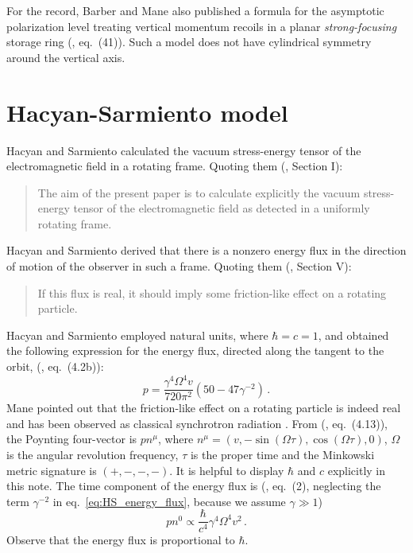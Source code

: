 \documentclass[review]{elsarticle}
\theoremstyle{plain}
\begin{document}
For the record,
Barber and Mane also published a formula for the asymptotic polarization level treating vertical momentum recoils in a planar \emph{strong-focusing} storage ring (\cite{BM}, eq.~(41)).
Such a model does not have cylindrical symmetry around the vertical axis.

\setcounter{equation}{0}
\section{Hacyan-Sarmiento model}\label{sec:HS}
Hacyan and Sarmiento \cite{HS} calculated the vacuum stress-energy tensor of the electromagnetic field in a rotating frame.
Quoting them (\cite{HS}, Section I):
\begin{quote}
The aim of the present paper is to calculate explicitly
the vacuum stress-energy tensor of the electromagnetic
field as detected in a uniformly rotating frame.
\end{quote}
Hacyan and Sarmiento derived that there is a nonzero energy flux in the direction of motion of the observer in such a frame.
Quoting them (\cite{HS}, Section V):
\begin{quote}
If this flux is real, it should imply some friction-like effect on a rotating particle.
\end{quote}
Hacyan and Sarmiento employed natural units, where $\hbar=c=1$, and obtained the following expression for the energy flux, directed along the tangent to the orbit,
(\cite{HS}, eq.~(4.2b)):
\begin{equation}
\label{eq:HS_energy_flux}
p = \frac{\gamma^4\Omega^4v}{720\pi^2}(50 -47\gamma^{-2}) \,.
\end{equation}
Mane \cite{ManeHS} pointed out that the friction-like effect on a rotating particle is indeed real and has been observed as classical synchrotron radiation \cite{Schwinger1949}.
From (\cite{HS}, eq.~(4.13)), the Poynting four-vector is $pn^\mu$, where $n^\mu =(v, -\sin(\Omega\tau), \cos(\Omega\tau), 0)$,
$\Omega$ is the angular revolution frequency, $\tau$ is the proper time and the Minkowski metric signature is $(+,-,-,-)$.
It is helpful to display $\hbar$ and $c$ explicitly in this note.
The time component of the energy flux is (\cite{ManeHS}, eq.~(2), neglecting the term $\gamma^{-2}$ in eq.~\eqref{eq:HS_energy_flux}, because we assume $\gamma\gg1$)
\begin{equation}
\label{eq:Mane_comment_eq2}
pn^0 \propto \frac{\hbar}{c^4}\gamma^4\Omega^4v^2 \,.
\end{equation}
Observe that the energy flux is proportional to $\hbar$.
\end{document}
